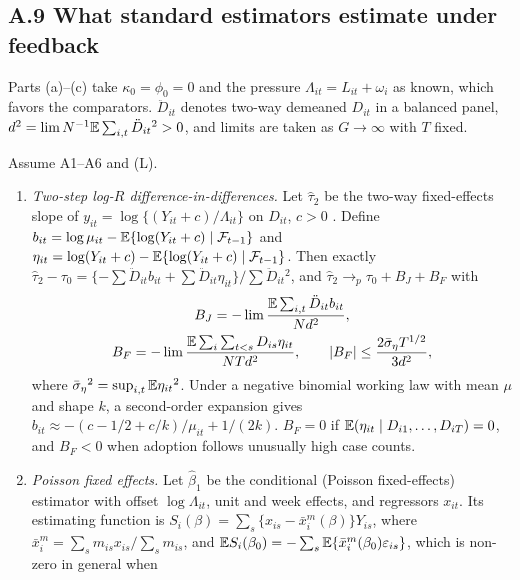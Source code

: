 
\subsection{A.9 What standard estimators estimate under feedback}
\label{ss:bias}

Parts (a)--(c) take $\kappa_0=\phi_0=0$ and the pressure $\Lambda_{it}=L_{it}+\omega_i$ as
known, which favors the comparators. $\ddot D_{it}$ denotes two-way demeaned $D_{it}$ in a
balanced panel, $d^2=\lim N^{-1}\mathbb{E}\sum_{i,t}\ddot D_{it}{}^2>0$, and limits are taken as
$G\to\infty$ with $T$ fixed.

\begin{theorem}
\label{thm:bias}
Assume A1--A6 and (L).
\begin{enumerate}
\item[(a)] \emph{Two-step log-$R$ difference-in-differences.} Let $\hat\tau_2$ be the two-way
fixed-effects slope of $y_{it}=\log\{(Y_{it}+c)/\Lambda_{it}\}$ on $D_{it}$, $c>0$
\citep{feng2024parallel}. Define $b_{it}=\log\mu_{it}-\mathbb{E}\{\log(Y_{it}+c)\mid\mathcal{F}_{t-1}\}$ and
$\eta_{it}=\log(Y_{it}+c)-\mathbb{E}\{\log(Y_{it}+c)\mid\mathcal{F}_{t-1}\}$. Then exactly
$\hat\tau_2-\tau_0=\{-\sum\ddot D_{it}b_{it}+\sum\ddot D_{it}\eta_{it}\}/\sum\ddot D_{it}{}^2$, and
$\hat\tau_2\to_p\tau_0+B_J+B_F$ with
\begin{gather*}
B_J=-\lim\frac{\mathbb{E}\sum_{i,t}\ddot D_{it}b_{it}}{Nd^2},\\
B_F=-\lim\frac{\mathbb{E}\sum_i\sum_{t<s}D_{is}\eta_{it}}{NTd^2},\qquad
|B_F|\le\frac{2\bar\sigma_\eta T^{1/2}}{3d^2},
\end{gather*}
where $\bar\sigma_\eta{}^2=\sup_{i,t}\mathbb{E}\eta_{it}{}^2$. Under a negative binomial working law with mean
$\mu$ and shape $k$, a second-order expansion gives $b_{it}\approx-(c-1/2+c/k)/\mu_{it}+1/(2k)$.
$B_F=0$ if $\mathbb{E}(\eta_{it}\mid D_{i1},\dots,D_{iT})=0$, and $B_F<0$ when adoption follows unusually
high case counts.
\item[(b)] \emph{Poisson fixed effects.} Let $\hat\beta_1$ be the conditional (Poisson
fixed-effects) estimator with offset $\log\Lambda_{it}$, unit and week effects, and regressors
$x_{it}$. Its estimating function is $S_i(\beta)=\sum_s\{x_{is}-\bar x^m_i(\beta)\}Y_{is}$, where
$\bar x^m_i=\sum_s m_{is}x_{is}/\sum_s m_{is}$, and
$\mathbb{E} S_i(\beta_0)=-\sum_s\mathbb{E}\{\bar x^m_i(\beta_0)\varepsilon_{is}\}$, which is non-zero in general when

\end{enumerate}
\end{theorem}
